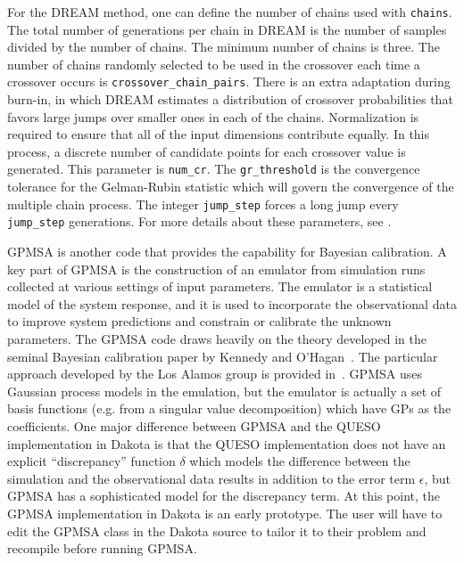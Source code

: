 For the DREAM method, one can define the number of chains used with
\texttt{chains}.  The total number of generations per chain in DREAM is
the number of samples divided by the number of chains.
The minimum number of chains is three.
The number of chains randomly selected to be used in the crossover
each time a crossover occurs is \texttt{crossover\_chain\_pairs}.
There is an extra adaptation during burn-in, in which DREAM estimates a
distribution of crossover probabilities that favors large jumps over
smaller ones in each of the chains.
Normalization is required to ensure that all of the input dimensions contribute
equally.  In this process, a discrete number of candidate points for
each crossover value is generated.  This parameter is \texttt{num\_cr}.
The \texttt{gr\_threshold} is the convergence tolerance for the Gelman-Rubin
statistic which will govern the convergence of the multiple chain
process.  The integer \texttt{jump\_step} forces a long jump every 
\texttt{jump\_step} generations.
For more details about these parameters, see \cite{Vrugt}. 

GPMSA is another code that provides the capability for Bayesian 
calibration.
A key part of GPMSA is the construction of an emulator from simulation runs 
collected at various settings of input parameters. The emulator is a 
statistical model of the system response, and it is used to incorporate 
the observational data to improve system predictions and constrain or 
calibrate the unknown parameters. The GPMSA code draws heavily 
on the theory developed in the seminal Bayesian calibration paper 
by Kennedy and O'Hagan~\cite{Kenn01}. The particular approach developed 
by the Los Alamos group is provided in~\cite{Hig08}. GPMSA uses 
Gaussian process models in the emulation, but the emulator is 
actually a set of basis functions (e.g. from a singular value 
decomposition) which have GPs as the coefficients. One major 
difference between GPMSA and the QUESO implementation in Dakota 
is that the QUESO implementation does not have an explicit 
``discrepancy'' function $\delta$ which models the difference between 
the simulation and the observational data results in addition 
to the error term $\epsilon$, but GPMSA has a sophisticated 
model for the discrepancy term. 
At this point, the GPMSA implementation in Dakota is an early 
prototype. The user will have to edit the GPMSA class in the Dakota source to tailor it to their problem 
and recompile before running GPMSA.
 

